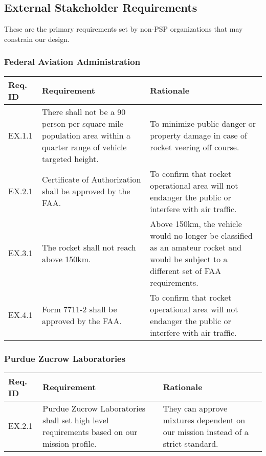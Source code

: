 \subsection{External Stakeholder Requirements}
These are the primary requirements set by non-PSP organizations that may constrain our design.


\subsubsection{Federal Aviation Administration}
\begin{table}[htbp]
    \centering
    \footnotesize 
    \setlength{\tymin}{40pt}
    \let\raggedright\RaggedRight
    
    \begin{tabulary}{\textwidth}{@{}LLL@{}}
    \toprule
        \textbf{Req. ID} & \textbf{Requirement} & \textbf{Rationale} \\
    \midrule
        EX.1.1 & There shall not be a 90 person per square mile population area within a quarter range of vehicle targeted height. & To minimize public danger or property damage in case of rocket veering off course. \\ 
        EX.2.1 & Certificate of Authorization shall be approved by the FAA. & To confirm that rocket operational area will not endanger the public or interfere with air traffic. \\ 
        EX.3.1 & The rocket shall not reach above 150km. & Above 150km, the vehicle would no longer be classified as an amateur rocket and would be subject to a different set of FAA requirements. \\
        EX.4.1 & Form 7711-2 shall be approved by the FAA. & To confirm that rocket operational area will not endanger the public or interfere with air traffic. \\
    \bottomrule
    \end{tabulary}

    \label{table:faa-stakeholder}
\end{table}


\subsubsection{Purdue Zucrow Laboratories}
\begin{table}[htbp]
    \centering
    \footnotesize 
    \setlength{\tymin}{40pt}
    \let\raggedright\RaggedRight
    
    \begin{tabulary}{\textwidth}{@{}LLL@{}}
    \toprule
        \textbf{Req. ID} & \textbf{Requirement} & \textbf{Rationale} \\
    \midrule
        EX.2.1 & Purdue Zucrow Laboratories shall set high level requirements based on our mission profile. & They can approve mixtures dependent on our mission instead of a strict standard. \\ 
    \bottomrule
    \end{tabulary}

    \label{table:pzl-stakeholder}
\end{table}


